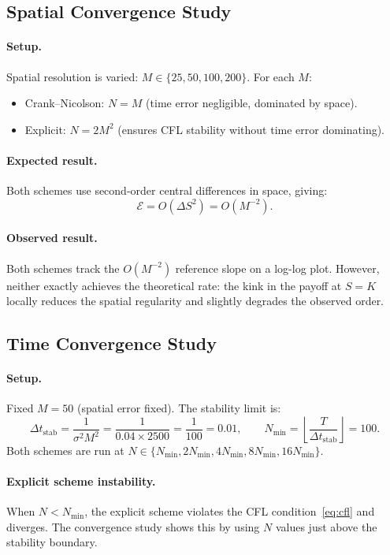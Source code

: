 \documentclass[12pt, a4paper]{article}
\begin{document}
\subsection{Spatial Convergence Study}

\paragraph{Setup.} Spatial resolution is varied: $M \in \{25, 50, 100, 200\}$.
For each $M$:
\begin{itemize}[noitemsep]
    \item Crank--Nicolson: $N = M$ (time error negligible, dominated by space).
    \item Explicit: $N = 2M^2$ (ensures CFL stability without time error dominating).
\end{itemize}

\paragraph{Expected result.} Both schemes use second-order central differences
in space, giving:
\[
    \mathcal{E} = O(\Delta S^2) = O(M^{-2}).
\]

\paragraph{Observed result.} Both schemes track the $O(M^{-2})$ reference
slope on a log-log plot. However, neither exactly achieves the theoretical
rate: the kink in the payoff at $S = K$ locally reduces the spatial regularity
and slightly degrades the observed order.

\subsection{Time Convergence Study}

\paragraph{Setup.} Fixed $M = 50$ (spatial error fixed). The stability limit
is:
\[
    \Delta t_{\text{stab}} = \frac{1}{\sigma^2 M^2} = \frac{1}{0.04 \times 2500}
    = \frac{1}{100} = 0.01,
    \qquad
    N_{\min} = \left\lfloor\frac{T}{\Delta t_{\text{stab}}}\right\rfloor = 100.
\]
Both schemes are run at $N \in \{N_{\min}, 2N_{\min}, 4N_{\min}, 8N_{\min},
16N_{\min}\}$.

\paragraph{Explicit scheme instability.} When $N < N_{\min}$, the explicit
scheme violates the CFL condition~\eqref{eq:cfl} and diverges. The convergence
study shows this by using $N$ values just above the stability boundary.
\end{document}
